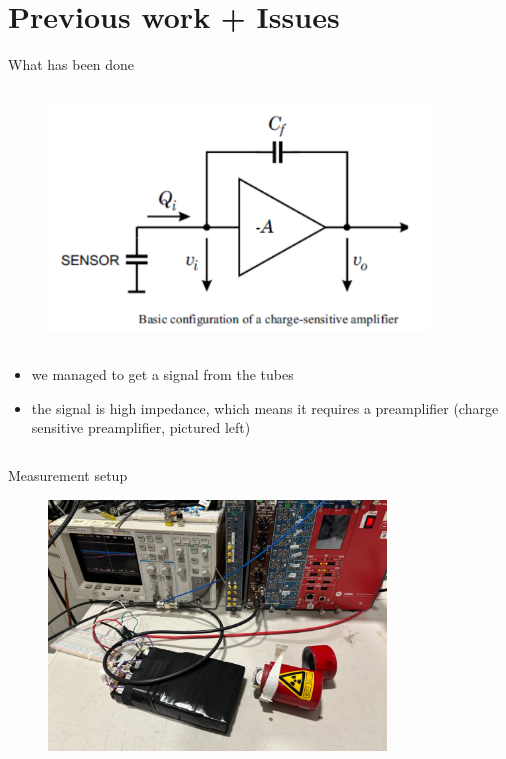 
\section{Previous work + Issues}
\begin{columnframe}{What has been done}
    \begin{column}{0.5\textwidth}
        \begin{figure}
            \centering
            \includegraphics[width=0.9\textwidth]{images/csp_schematic.png}
        \end{figure}
    \end{column}
    \begin{column}{0.5\textwidth}
        \begin{itemize}
            \item we managed to get a signal from the tubes
            \item the signal is high impedance, which means it requires a preamplifier (charge sensitive preamplifier, pictured left)
        \end{itemize}
    \end{column}
\end{columnframe}

\begin{frame}{Measurement setup}
    \begin{figure}
        \centering
        \includegraphics[width=0.8\textwidth]{images/measurement_setup.png}
    \end{figure}

\end{frame}

